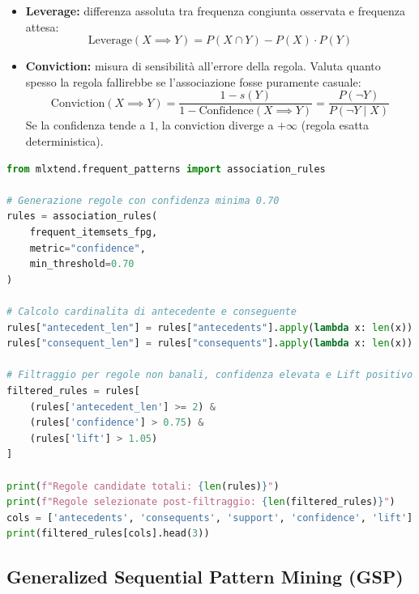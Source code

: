 \begin{definition}
\begin{itemize}
\begin{itemize}
    \end{itemize}
    \item \textbf{Leverage:} differenza assoluta tra frequenza congiunta osservata e frequenza attesa:
    \begin{equation}
        \text{Leverage}(X \implies Y) = P(X \cap Y) - P(X) \cdot P(Y)
    \end{equation}
    \item \textbf{Conviction:} misura di sensibilità all'errore della regola. Valuta quanto spesso la regola fallirebbe se l'associazione fosse puramente casuale:
    \begin{equation}
        \text{Conviction}(X \implies Y) = \frac{1 - s(Y)}{1 - \text{Confidence}(X \implies Y)} = \frac{P(\neg Y)}{P(\neg Y \mid X)}
    \end{equation}
    Se la confidenza tende a $1$, la conviction diverge a $+\infty$ (regola esatta deterministica).
\end{itemize}
\end{definition}

\begin{lstlisting}[language=Python, caption={Estrazione e filtraggio avanzato delle regole d'associazione.}]
from mlxtend.frequent_patterns import association_rules

# Generazione regole con confidenza minima 0.70
rules = association_rules(
    frequent_itemsets_fpg,
    metric="confidence",
    min_threshold=0.70
)

# Calcolo cardinalita di antecedente e conseguente
rules["antecedent_len"] = rules["antecedents"].apply(lambda x: len(x))
rules["consequent_len"] = rules["consequents"].apply(lambda x: len(x))

# Filtraggio per regole non banali, confidenza elevata e Lift positivo
filtered_rules = rules[
    (rules['antecedent_len'] >= 2) & 
    (rules['confidence'] > 0.75) & 
    (rules['lift'] > 1.05)
]

print(f"Regole candidate totali: {len(rules)}")
print(f"Regole selezionate post-filtraggio: {len(filtered_rules)}")
cols = ['antecedents', 'consequents', 'support', 'confidence', 'lift']
print(filtered_rules[cols].head(3))
\end{lstlisting}

\FloatBarrier
\subsection{Generalized Sequential Pattern Mining (GSP)}
\label{subsec:lab-gsp-sequential}

